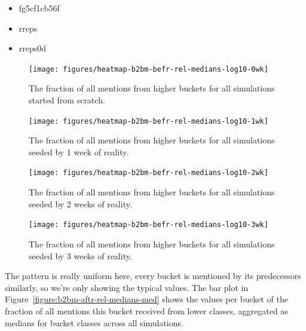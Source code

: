 \documentclass[10pt,oneside]{memoir}
\begin{document}
\begin{Spacing}{2}
\begin{itemize}
\item fg5cf1cb56f

\item rreps

\item rreps0d
\end{itemize}


\begin{figure}
\begin{center}
    \texttt{[image: figures/heatmap-b2bm-befr-rel-medians-log10-0wk]}
    \caption{The fraction of all mentions from higher buckets for all simulations started from scratch.}
    \label{figure:heatmap-b2bm-befr-rel-medians-0wk}
\end{center}
\end{figure}

\begin{figure}
\begin{center}
    \texttt{[image: figures/heatmap-b2bm-befr-rel-medians-log10-1wk]}
    \caption{The fraction of all mentions from higher buckets for all simulations seeded by 1 week of reality.}
    \label{figure:heatmap-b2bm-befr-rel-medians-1wk}
\end{center}
\end{figure}

\begin{figure}
\begin{center}
    \texttt{[image: figures/heatmap-b2bm-befr-rel-medians-log10-2wk]}
    \caption{The fraction of all mentions from higher buckets for all simulations seeded by 2 weeks of reality.}
    \label{figure:heatmap-b2bm-befr-rel-medians-2wk}
\end{center}
\end{figure}

\begin{figure}
\begin{center}
    \texttt{[image: figures/heatmap-b2bm-befr-rel-medians-log10-3wk]}
    \caption{The fraction of all mentions from higher buckets for all simulations seeded by 3 weeks of reality.}
    \label{figure:heatmap-b2bm-befr-rel-medians-3wk}
\end{center}
\end{figure}
The pattern is really uniform here, every bucket is mentioned by its predecessors similarly, so we're only showing the typical values.  The bar plot in Figure~\ref{figure:b2bm-aftr-rel-medians-med} shows the values per bucket of the fraction of all mentions this bucket received from lower classes, aggregated as medians for bucket classes across all simulations.




\end{Spacing}
\end{document}
